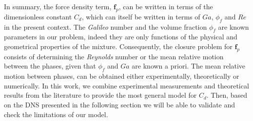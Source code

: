 In summary, the force density term, $\textbf{f}_p$, can be written in terms of the dimensionless constant $C_d$, which can itself be written in terms of $Ga$, $\phi_f$ and $Re$ in the present context. 
The \textit{Galileo} number and the volume fraction $\phi_f$ are known parameters in our problem, indeed they are only functions of the physical and geometrical properties of the mixture.
Consequently, the closure problem for $\textbf{f}_p$ consists of determining the \textit{Reynolds} number or the mean relative motion between the phases, given that $\phi_f$ and $Ga$ are known a priori. 
The mean relative motion between phases, can be obtained either experimentally, theoretically or numerically. 
In this work, we combine experimental measurements and theoretical results from the literature to provide the most general model for $C_d$.
Then, based on the DNS presented in the following section we will be able to validate and check the limitations of our model. 
 
